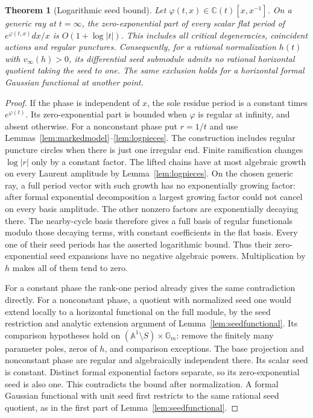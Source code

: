 \documentclass[11pt]{article}
\newtheorem{theorem}{Theorem}[section]
\theoremstyle{definition}\newtheorem{definition}[theorem]{Definition}
\theoremstyle{remark}\newtheorem{remark}[theorem]{Remark}
\newcommand{\C}{\mathbb C}
\begin{document}
\begin{theorem}[Logarithmic seed bound]\label{thm:laurentlog}
Let $\varphi(t,x)\in\C(t)[x,x^{-1}]$. On a generic ray at
$t=\infty$, the zero-exponential part of every scalar flat period
of $e^{\varphi(t,x)}dx/x$ is $O(1+\log|t|)$. This includes all
critical degeneracies, coincident actions and regular punctures.
Consequently, for a rational normalization $h(t)$ with
$v_\infty(h)>0$, its differential seed submodule admits no rational
horizontal quotient taking the seed to one. The same exclusion
holds for a horizontal formal Gaussian functional at another point.
\end{theorem}
\begin{proof}
If the phase is independent of $x$, the sole residue period is a
constant times $e^{\varphi(t)}$. Its zero-exponential part is bounded
when $\varphi$ is regular at infinity, and absent otherwise.
For a nonconstant phase put $r=1/t$ and use
Lemmas~\ref{lem:markedmodel}--\ref{lem:logpieces}. The construction
includes regular puncture circles when there is just one irregular end.
Finite ramification changes $\log|r|$ only by a constant factor.
The lifted chains have at most algebraic growth on every Laurent
amplitude by Lemma~\ref{lem:logpieces}. On the chosen generic ray,
a full period vector with such growth has no exponentially growing
factor: after formal exponential decomposition a largest growing
factor could not cancel on every basis amplitude. The other nonzero
factors are exponentially decaying there. The nearby-cycle basis
therefore gives a full basis of regular functionals modulo those
decaying terms, with constant coefficients in the flat basis. Every
one of their seed periods has the asserted logarithmic bound. Thus
their zero-exponential seed
expansions have no negative algebraic powers. Multiplication by $h$
makes all of them tend to zero.

For a constant phase the rank-one period already gives the same
contradiction directly. For a nonconstant phase, a quotient with
normalized seed one would extend locally to a
horizontal functional on the full module, by the seed restriction
and analytic extension argument of Lemma~\ref{lem:seedfunctional}.
Its comparison hypotheses hold on
$(\mathbb A^1\setminus S)\times\mathbb G_m$: remove the finitely
many parameter poles, zeros of $h$, and comparison exceptions.
The base projection and nonconstant phase are regular and
algebraically independent there.
Its scalar seed is constant. Distinct formal exponential factors
separate, so its zero-exponential seed is also one. This contradicts
the bound after normalization. A formal Gaussian functional with
unit seed first restricts to the same rational seed quotient, as in
the first part of Lemma~\ref{lem:seedfunctional}.
\end{proof}
\end{document}
